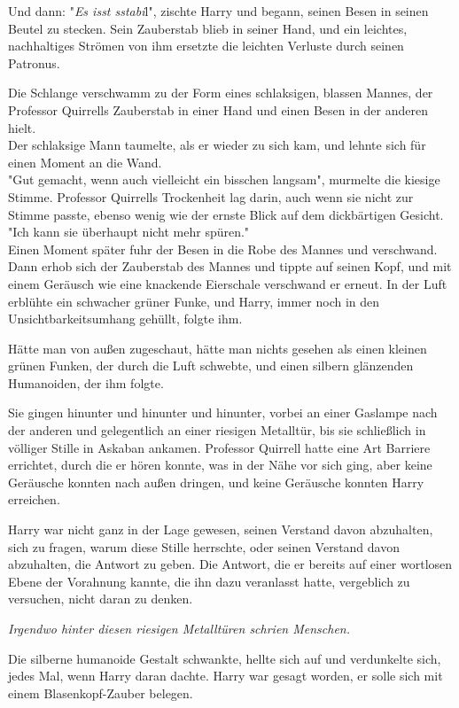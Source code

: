 {Und dann: "\emph{Es isst sstabi}l", zischte Harry und begann, seinen Besen in seinen Beutel zu stecken. Sein Zauberstab blieb in seiner Hand, und ein leichtes, nachhaltiges Strömen von ihm ersetzte die leichten Verluste durch seinen Patronus.

Die Schlange verschwamm zu der Form eines schlaksigen, blassen Mannes, der Professor Quirrells Zauberstab in einer Hand und einen Besen in der anderen hielt.\\ Der schlaksige Mann taumelte, als er wieder zu sich kam, und lehnte sich für einen Moment an die Wand.\\ "Gut gemacht, wenn auch vielleicht ein bisschen langsam", murmelte die kiesige Stimme. Professor Quirrells Trockenheit lag darin, auch wenn sie nicht zur Stimme passte, ebenso wenig wie der ernste Blick auf dem dickbärtigen Gesicht.\\ "Ich kann sie überhaupt nicht mehr spüren."\\ Einen Moment später fuhr der Besen in die Robe des Mannes und verschwand.\\ Dann erhob sich der Zauberstab des Mannes und tippte auf seinen Kopf, und mit einem Geräusch wie eine knackende Eierschale verschwand er erneut. In der Luft erblühte ein schwacher grüner Funke, und Harry, immer noch in den Unsichtbarkeitsumhang gehüllt, folgte ihm.

Hätte man von außen zugeschaut, hätte man nichts gesehen als einen kleinen grünen Funken, der durch die Luft schwebte, und einen silbern glänzenden Humanoiden, der ihm folgte.

Sie gingen hinunter und hinunter und hinunter, vorbei an einer Gaslampe nach der anderen und gelegentlich an einer riesigen Metalltür, bis sie schließlich in völliger Stille in Askaban ankamen. Professor Quirrell hatte eine Art Barriere errichtet, durch die er hören konnte, was in der Nähe vor sich ging, aber keine Geräusche konnten nach außen dringen, und keine Geräusche konnten Harry erreichen.

Harry war nicht ganz in der Lage gewesen, seinen Verstand davon abzuhalten, sich zu fragen, warum diese Stille herrschte, oder seinen Verstand davon abzuhalten, die Antwort zu geben. Die Antwort, die er bereits auf einer wortlosen Ebene der Vorahnung kannte, die ihn dazu veranlasst hatte, vergeblich zu versuchen, nicht daran zu denken.

\emph{Irgendwo hinter diesen riesigen Metalltüren schrien Menschen.}

Die silberne humanoide Gestalt schwankte, hellte sich auf und verdunkelte sich, jedes Mal, wenn Harry daran dachte. Harry war gesagt worden, er solle sich mit einem Blasenkopf-Zauber belegen.

}
